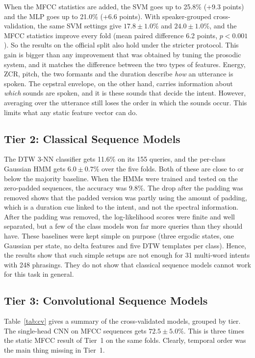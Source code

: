 \documentclass[conference]{IEEEtran}
\begin{document}
When the MFCC statistics are added, the SVM goes up to 25.8\% (+9.3 points) and the MLP goes up to 21.0\% (+6.6 points). With speaker-grouped cross-validation, the same SVM settings give $17.8 \pm 1.0\%$ and $24.0 \pm 1.0\%$, and the MFCC statistics improve every fold (mean paired difference 6.2 points, $p < 0.001$). So the results on the official split also hold under the stricter protocol. This gain is bigger than any improvement that was obtained by tuning the prosodic system, and it matches the difference between the two types of features. Energy, ZCR, pitch, the two formants and the duration describe \emph{how} an utterance is spoken. The cepstral envelope, on the other hand, carries information about \emph{which} sounds are spoken, and it is these sounds that decide the intent. However, averaging over the utterance still loses the order in which the sounds occur. This limits what any static feature vector can do.

\subsection{Tier 2: Classical Sequence Models}
The DTW 3-NN classifier gets 11.6\% on its 155 queries, and the per-class Gaussian HMM gets $6.0 \pm 0.7\%$ over the five folds. Both of these are close to or below the majority baseline. When the HMMs were trained and tested on the zero-padded sequences, the accuracy was $9.8\%$. The drop after the padding was removed shows that the padded version was partly using the amount of padding, which is a duration cue linked to the intent, and not the spectral information. After the padding was removed, the log-likelihood scores were finite and well separated, but a few of the class models won far more queries than they should have. These baselines were kept simple on purpose (three ergodic states, one Gaussian per state, no delta features and five DTW templates per class). Hence, the results show that such simple setups are not enough for 31 multi-word intents with 248 phrasings. They do not show that classical sequence models cannot work for this task in general.

\subsection{Tier 3: Convolutional Sequence Models}
Table~\ref{tab:cv} gives a summary of the cross-validated models, grouped by tier. The single-head CNN on MFCC sequences gets $72.5 \pm 5.0\%$. This is three times the static MFCC result of Tier~1 on the same folds. Clearly, temporal order was the main thing missing in Tier~1.
\end{document}
